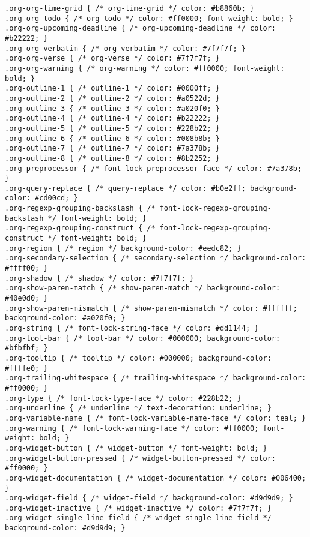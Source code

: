 \documentclass[11pt]{article}
\begin{document}
\begin{verbatim}
.org-org-time-grid { /* org-time-grid */ color: #b8860b; }
.org-org-todo { /* org-todo */ color: #ff0000; font-weight: bold; }
.org-org-upcoming-deadline { /* org-upcoming-deadline */ color: #b22222; }
.org-org-verbatim { /* org-verbatim */ color: #7f7f7f; }
.org-org-verse { /* org-verse */ color: #7f7f7f; }
.org-org-warning { /* org-warning */ color: #ff0000; font-weight: bold; }
.org-outline-1 { /* outline-1 */ color: #0000ff; }
.org-outline-2 { /* outline-2 */ color: #a0522d; }
.org-outline-3 { /* outline-3 */ color: #a020f0; }
.org-outline-4 { /* outline-4 */ color: #b22222; }
.org-outline-5 { /* outline-5 */ color: #228b22; }
.org-outline-6 { /* outline-6 */ color: #008b8b; }
.org-outline-7 { /* outline-7 */ color: #7a378b; }
.org-outline-8 { /* outline-8 */ color: #8b2252; }
.org-preprocessor { /* font-lock-preprocessor-face */ color: #7a378b; }
.org-query-replace { /* query-replace */ color: #b0e2ff; background-color: #cd00cd; }
.org-regexp-grouping-backslash { /* font-lock-regexp-grouping-backslash */ font-weight: bold; }
.org-regexp-grouping-construct { /* font-lock-regexp-grouping-construct */ font-weight: bold; }
.org-region { /* region */ background-color: #eedc82; }
.org-secondary-selection { /* secondary-selection */ background-color: #ffff00; }
.org-shadow { /* shadow */ color: #7f7f7f; }
.org-show-paren-match { /* show-paren-match */ background-color: #40e0d0; }
.org-show-paren-mismatch { /* show-paren-mismatch */ color: #ffffff; background-color: #a020f0; }
.org-string { /* font-lock-string-face */ color: #dd1144; }
.org-tool-bar { /* tool-bar */ color: #000000; background-color: #bfbfbf; }
.org-tooltip { /* tooltip */ color: #000000; background-color: #ffffe0; }
.org-trailing-whitespace { /* trailing-whitespace */ background-color: #ff0000; }
.org-type { /* font-lock-type-face */ color: #228b22; }
.org-underline { /* underline */ text-decoration: underline; }
.org-variable-name { /* font-lock-variable-name-face */ color: teal; }
.org-warning { /* font-lock-warning-face */ color: #ff0000; font-weight: bold; }
.org-widget-button { /* widget-button */ font-weight: bold; }
.org-widget-button-pressed { /* widget-button-pressed */ color: #ff0000; }
.org-widget-documentation { /* widget-documentation */ color: #006400; }
.org-widget-field { /* widget-field */ background-color: #d9d9d9; }
.org-widget-inactive { /* widget-inactive */ color: #7f7f7f; }
.org-widget-single-line-field { /* widget-single-line-field */ background-color: #d9d9d9; }
\end{verbatim}
\end{document}
